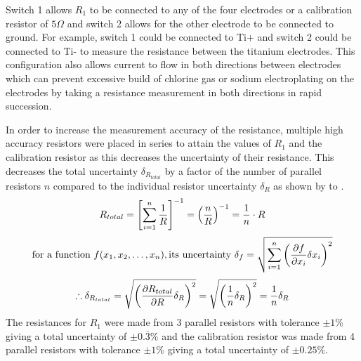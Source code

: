 Switch 1 allows $R_1$ to be connected to any of the four electrodes or a calibration resistor of $5\Omega$ and switch 2 allows for the other electrode to be connected to ground.
For example, switch 1 could be connected to Ti+ and switch 2 could be connected to Ti- to measure the resistance between the titanium electrodes.
This configuration also allows current to flow in both directions between electrodes which can prevent excessive build of chlorine gas or sodium electroplating on the electrodes by taking a resistance measurement in both directions in rapid succession.

In order to increase the measurement accuracy of the resistance, multiple high accuracy resistors were placed in series to attain the values of $R_1$ and the calibration resistor as this decreases the uncertainty of their resistance.
This decreases the total uncertainty $\delta_{R_{total}}$ by a factor of the number of parallel resistors $n$ compared to the individual resistor uncertainty $\delta_R$ as shown by  to .
\begin{equation}[!h]\label{eqn:parallel-resistor-total}
    R_{total} = {\left[ \sum_{i=1}^{n} \lfrac{1}{R} \right]}^{-1} = {\left(\lfrac{n}{R}\right)}^{-1} = \lfrac{1}{n}\cdot R
\end{equation}
\begin{equation}[!h]\label{eqn:uncertainty-general-formula}
    \text{for a function}~f(x_1,x_2,\dots,x_n), \text{its uncertainty} ~\delta_f = \sqrt{\sum_{i=1}^{n} {\left( \lfrac{\partial f}{\partial x_i} \delta x_i \right)}^2}
\end{equation}
\begin{equation}[!h]\label{eqn:parallel-resistor-uncertainty}
    \therefore \delta_{R_{total}} = \sqrt{{\left( \lfrac{\partial R_{total}}{\partial R} \delta_R \right)}^2} = \sqrt{{\left( \lfrac{1}{n} \delta_R \right)}^2} = \lfrac{1}{n} \delta_R
\end{equation}
The resistances for $R_1$ were made from 3 parallel resistors with tolerance $\pm1\%$ giving a total uncertainty of $\pm0.\bar{3}\%$ and the calibration resistor was made from 4 parallel resistors with tolerance $\pm1\%$ giving a total uncertainty of $\pm0.25\%$.

